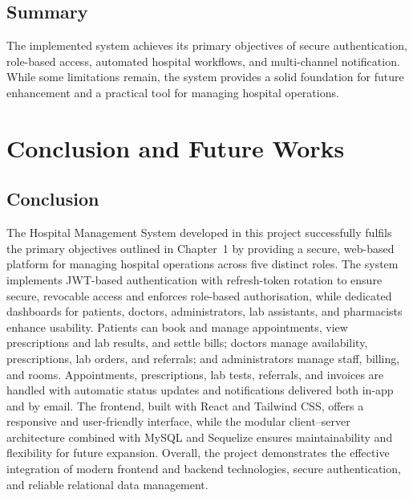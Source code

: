 \documentclass[12pt,a4paper]{report}
\begin{document}
\section{Summary}
The implemented system achieves its primary objectives of secure authentication,
role-based access, automated hospital workflows, and multi-channel notification. While
some limitations remain, the system provides a solid foundation for future enhancement
and a practical tool for managing hospital operations.

\chapter{Conclusion and Future Works}

\section{Conclusion}
The Hospital Management System developed in this project successfully fulfils the
primary objectives outlined in Chapter~1 by providing a secure, web-based platform for
managing hospital operations across five distinct roles. The system implements JWT-based
authentication with refresh-token rotation to ensure secure, revocable access and
enforces role-based authorisation, while dedicated dashboards for patients, doctors,
administrators, lab assistants, and pharmacists enhance usability. Patients can book and
manage appointments, view prescriptions and lab results, and settle bills; doctors
manage availability, prescriptions, lab orders, and referrals; and administrators manage
staff, billing, and rooms. Appointments, prescriptions, lab tests, referrals, and
invoices are handled with automatic status updates and notifications delivered both
in-app and by email. The frontend, built with React and Tailwind CSS, offers a
responsive and user-friendly interface, while the modular client--server architecture
combined with MySQL and Sequelize ensures maintainability and flexibility for future
expansion. Overall, the project demonstrates the effective integration of modern
frontend and backend technologies, secure authentication, and reliable relational data
management.
\end{document}
